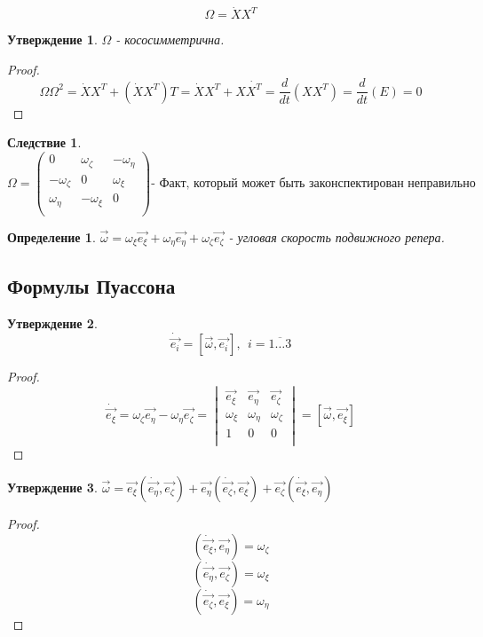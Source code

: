 \documentclass{article}
\newtheorem*{df}{Определение}
\newtheorem{ass}{Утверждение}
\newtheorem*{cor}{Следствие}
\begin{document}
  $$ \Omega = \dot X X^T $$

  
  \begin{ass}
  $\Omega$ - кососимметрична.
  \end{ass}
  \begin{proof}
  $$ \Omega \Omega^2 = \dot X X^T + (\dot X X^T)T = \dot X X^T + X \dot {X^T} = \frac{d}{dt}(XX^T) = 
  \frac{d}{dt}(E) = 0 $$
  \end{proof}
  
  \begin{cor}
  $$ \Omega =
  \left(
  \begin{matrix}
  0 & \omega_{\zeta} & -\omega_{\eta} \\
  -\omega_{\zeta} & 0 & \omega_{\xi} \\
  \omega_{\eta} & -\omega_{\xi} & 0 \\
  \end{matrix}
  \right)
  \text{- Факт, который может быть законспектирован неправильно}
  $$
  \end{cor}
  
  \begin{df}
  $ \vec{\omega} = \omega_{\xi}\vec{e_{\xi}} + \omega_{\eta}\vec{e_{\eta}} + \omega_{\zeta}\vec{e_{\zeta}} $ - угловая скорость подвижного репера.
  \end{df}
  
  \subsection{Формулы Пуассона}
  \begin{ass}
  $$ \dot{\vec{e_i}} = [\vec{\omega}, \vec{e_i}],~~ i = \overline{1 \ldots 3} $$
  \end{ass}
  \begin{proof}
  $$
  \dot{\vec{e_{\xi}}} = \omega_{\zeta} \vec{e_{\eta}} - \omega_{\eta} \vec{e_{\zeta}} =
  \begin{vmatrix}
  \vec{e_{\xi}} & \vec{e_{\eta}} & \vec{e_{\zeta}} \\
  \omega_{\xi} & \omega_{\eta} & \omega_{\zeta} \\
  1 & 0 & 0 \\ 
  \end{vmatrix}
  =
  [\vec{\omega}, \vec{e_{\xi}}] 
  $$
  \end{proof}
  
  \begin{ass}
  $ \vec{\omega} = \vec{e_{\xi}}(\dot{\vec{e_{\eta}}}, \vec{e_{\zeta}}) + \vec{e_{\eta}}(\dot{\vec{e_{\zeta}}}, \vec{e_{\xi}}) + \vec{e_{\zeta}}(\dot{\vec{e_{\xi}}}, \vec{e_{\eta}}) $
  \end{ass}
  \begin{proof}
  $$ (\dot{\vec{e_{\xi}}}, \vec{e_{\eta}}) = \omega_{\zeta} $$
  $$ (\dot{\vec{e_{\eta}}}, \vec{e_{\zeta}}) = \omega_{\xi} $$
  $$ (\dot{\vec{e_{\zeta}}}, \vec{e_{\xi}}) = \omega_{\eta} $$
  \end{proof}
  
\end{document}
